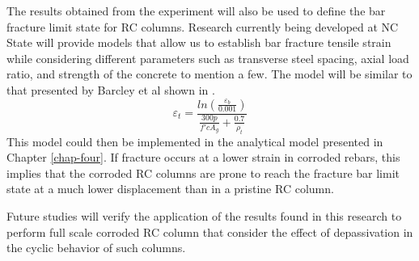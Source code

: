 The results obtained from the experiment will also be used to define the bar fracture limit state for RC columns. Research currently being developed at NC State will provide models that allow us to establish bar fracture tensile strain while considering different parameters such as transverse steel spacing, axial load ratio, and strength of the concrete to mention a few. The model will be similar to that presented by Barcley et al \cite{Barcley2018} shown in . 
\begin{equation}
    \varepsilon_{t}=\frac{ln(\frac{\varepsilon_{b}}{0.001})}{\frac{300p}{f'c A_{g}}+\frac{0.7}{\rho_{t}}}
    \label{eq.BarFracture}
\end{equation}
This model could then be implemented in the analytical model presented in Chapter \ref{chap-four}. If fracture occurs at a lower strain in corroded rebars, this implies that the corroded RC columns are prone to reach the fracture bar limit state at a much lower displacement than in a pristine RC column.

Future studies will verify the application of the results found in this research to perform full scale corroded RC column that consider the effect of depassivation in the cyclic behavior of such columns.